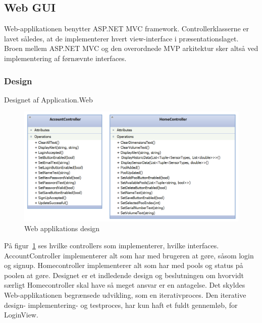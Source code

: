 \subsection{Web GUI}
Web-applikationen benytter ASP.NET MVC framework. Controllerklasserne er lavet således, at de implementerer hvert view-interface i præsentationslaget. Broen mellem ASP.NET MVC og den overordnede MVP arkitektur sker altså ved implementering af førnævnte interfaces.

\subsubsection{Design}
Designet af Application.Web
\begin{figure}
	\centering
	\includegraphics[width=0.9\linewidth]{figs/design/application_web}
	\caption{Web applikations design}
	\label{fig:web_class}
\end{figure}

På figur~\ref{fig:web_class} ses hvilke controllers som implementerer, hvilke interfaces. AccountController implementerer alt som har med brugeren at gøre, såsom login og signup. Homecontroller implementerer alt som har med pools og status på poolen at gøre. Designet er et indledende design og beslutningen om hvorvidt særligt Homecontroller skal have så meget ansvar er en antagelse. Det skyldes Web-applikationen begrænsede udvikling, som en iterativproces. Den iterative design- implementering- og testproces, har kun haft et fuldt gennemløb, for LoginView. 

